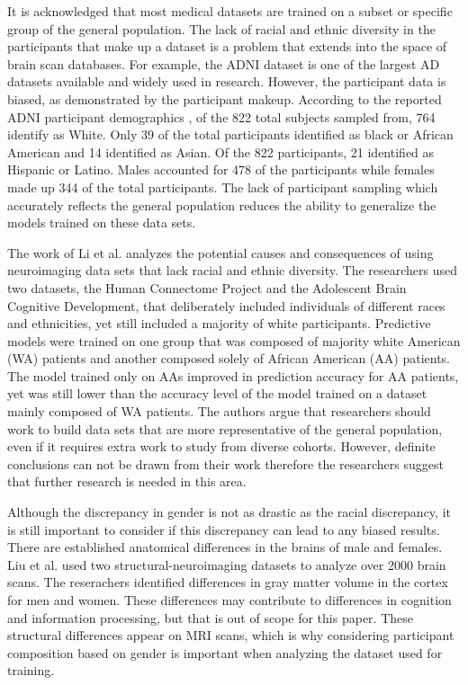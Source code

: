 \documentclass[10pt,twocolumn]{article}
\begin{document}
It is acknowledged that most medical datasets are trained on a subset or specific group of the general population. The lack of racial and ethnic diversity in the participants that make up a dataset is a problem that extends into the space of brain scan databases. For example, the ADNI dataset is one of the largest AD datasets available and widely used in research. However, the participant data is biased, as demonstrated by the participant makeup. According to the reported ADNI participant demographics \cite{adni}, of the 822 total subjects sampled from, 764 identify as White. Only 39 of the total participants identified as black or African American and 14 identified as Asian. Of the 822 participants, 21 identified as Hispanic or Latino. Males accounted for 478 of the participants while females made up 344 of the total participants. The lack of participant sampling which accurately reflects the general population reduces the ability to generalize the models trained on these data sets. 

The work of \cite{li2022cross} Li et al. analyzes the potential causes and consequences of using neuroimaging data sets that lack racial and ethnic diversity. The researchers used two datasets, the Human Connectome Project and the Adolescent Brain Cognitive Development, that deliberately included individuals of different races and ethnicities, yet still included a majority of white participants. Predictive models were trained on one group that was composed of majority white American (WA) patients and another composed solely of African American (AA) patients. The model trained only on AAs improved in prediction accuracy for AA patients, yet was still lower than the accuracy level of the model trained on a dataset mainly composed of WA patients. The authors argue that researchers should work to build data sets that are more representative of the general population, even if it requires extra work to study from diverse cohorts. However, definite conclusions can not be drawn from their work therefore the researchers suggest that further research is needed in this area. 

Although the discrepancy in gender is not as drastic as the racial discrepancy, it is still important to consider if this discrepancy can lead to any biased results. There are established anatomical differences in the brains of male and females. Liu et al. \cite{liu2020integrative} used two  structural-neuroimaging datasets to analyze over 2000 brain scans. The reserachers identified differences in gray matter volume in the cortex for men and women. These differences may contribute to differences in cognition and information processing, but that is out of scope for this paper. These structural differences appear on MRI scans, which is why considering participant composition based on gender is important when analyzing the dataset used for training. 
\end{document}
